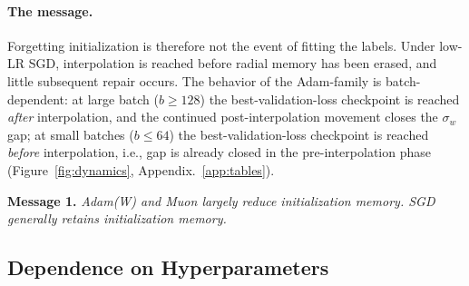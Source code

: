 \documentclass{article}
\newcommand{\sigw}{\sigma_w}
\begin{document}
\vspace{-0.5em}
\paragraph{The message.}
Forgetting initialization is therefore not the event of fitting the labels. Under low-LR SGD, interpolation is reached before radial memory has been erased, and little subsequent repair occurs. The behavior of the Adam-family is batch-dependent: at large batch ($b\ge128$) the best-validation-loss checkpoint is reached \emph{after} interpolation, and the continued post-interpolation movement closes the $\sigw$ gap; at small batches ($b \le 64$) the best-validation-loss checkpoint is reached \emph{before} interpolation, i.e., gap is already closed in the pre-interpolation phase (Figure~\ref{fig:dynamics}, Appendix.~\ref{app:tables}). 

\begin{summarybox}
\textbf{Message 1.}
\textit{Adam(W) and Muon largely reduce initialization memory. SGD generally retains initialization memory.}
\end{summarybox}

\vspace{-0.3em}

\vspace{-0.55em}
\subsection{Dependence on Hyperparameters}
\label{sec:erasing}
\end{document}

